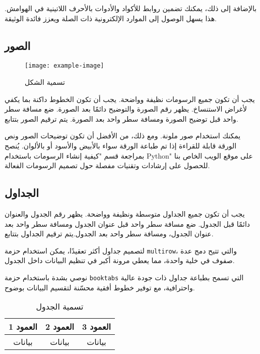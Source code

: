 \documentclass[12pt]{article}
\begin{document}
بالإضافة إلى ذلك، يمكنك تضمين روابط للأكواد والأدوات بالأحرف اللاتينية في الهوامش. هذا يسهل الوصول إلى الموارد الإلكترونية ذات الصلة ويعزز فائدة الوثيقة.

\subsection{الصور}

\begin{figure}[ht]
\centering
\texttt{[image: example-image]}
\caption{\textarabic{تسمية الشكل}}
\end{figure}

يجب أن تكون جميع الرسومات نظيفة وواضحة. يجب أن تكون الخطوط داكنة بما يكفي لأغراض الاستنساخ. يظهر رقم الصورة والتوضيح دائمًا بعد الصورة. ضع مسافة سطر واحد قبل توضيح الصورة ومسافة سطر واحد بعد الصورة. يتم ترقيم الصور بتتابع.

يمكنك استخدام صور ملونة. ومع ذلك، من الأفضل أن تكون توضيحات الصور ونص الورقة قابلة للقراءة إذا تم طباعة الورقة سواء بالأبيض والأسود أو بالألوان. يُنصح بمراجعة قسم "كيفية إنشاء الرسومات باستخدام Python" على موقع الويب الخاص بنا للحصول على إرشادات وتقنيات مفصلة حول تصميم الرسومات الفعالة.


\subsection{الجداول}

يجب أن تكون جميع الجداول متوسطة ونظيفة وواضحة. يظهر رقم الجدول والعنوان دائمًا قبل الجدول. ضع مسافة سطر واحد قبل عنوان الجدول ومسافة سطر واحد بعد عنوان الجدول، ومسافة سطر واحد بعد الجدول.يتم ترقيم الجداول بتتابع.

لتصميم جداول أكثر تعقيدًا، يمكن استخدام حزمة \verb|multirow|، والتي تتيح دمج عدة صفوف في خلية واحدة، مما يعطي مرونة أكبر في تنظيم البيانات داخل الجدول.

 نوصي بشدة باستخدام حزمة \verb|booktabs| التي تسمح بطباعة جداول ذات جودة عالية واحترافية، مع توفير خطوط أفقية محسّنة لتقسيم البيانات بوضوح.

\begin{table}[ht]
\centering
\caption{\textarabic{تسمية الجدول}}\label{tab:table}
\begin{tabular}{|c|c|c|}
\hline
\textarabic{العمود 1} & \textarabic{العمود 2} & \textarabic{العمود 3} \\
\hline
\textarabic{بيانات} & \textarabic{بيانات} & \textarabic{بيانات} \\
\hline
\end{tabular}
\end{table}
\end{document}
